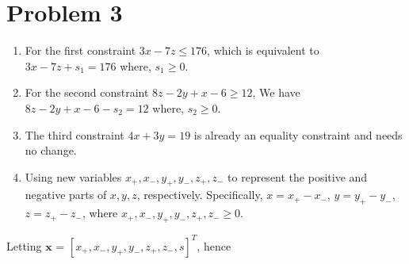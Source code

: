\documentclass[12pt]{article}
\begin{document}
\clearpage
\section{Problem 3}
\begin{enumerate}
    
    \item  For the first constraint \(3x - 7z \leq 176\), which is equivalent to \(3x - 7z + s_1 = 176\) where, \(s_1 \geq 0\).
    
    \item For the second constraint \(8z - 2y + x - 6 \geq 12\), We have \(8z - 2y + x - 6 - s_2 = 12\) where, \(s_2 \geq 0\).
    
    \item The third constraint \(4x + 3y = 19\) is already an equality constraint and needs no change.
    
    \item Using new variables \(x_+, x_-, y_+, y_-, z_+, z_-\) to represent the positive and negative parts of \(x, y, z\), respectively. Specifically, \(x = x_+ - x_-\), \(y = y_+ - y_-\), \(z = z_+ - z_-\), where \(x_+, x_-, y_+, y_-, z_+, z_- \geq 0\).
\end{enumerate}

Letting \( \mathbf{x} \) = \([x_+, x_-, y_+, y_-, z_+, z_-, s]^T\), hence
\end{document}
